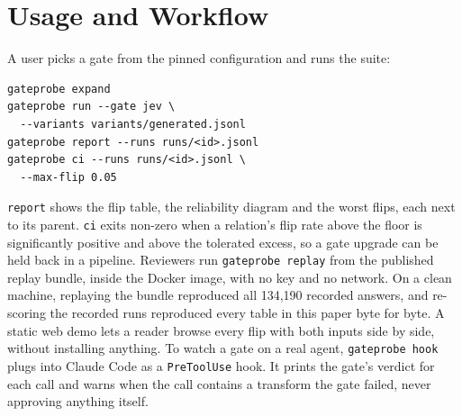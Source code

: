 
\section{Usage and Workflow}\label{sec:workflow}

A user picks a gate from the pinned configuration and runs the suite:
\begin{verbatim}
gateprobe expand
gateprobe run --gate jev \
  --variants variants/generated.jsonl
gateprobe report --runs runs/<id>.jsonl
gateprobe ci --runs runs/<id>.jsonl \
  --max-flip 0.05
\end{verbatim}
\texttt{report} shows the flip table, the reliability diagram and the worst
flips, each next to its parent. \texttt{ci} exits non-zero when a relation's
flip rate above the floor is significantly positive and above the tolerated
excess, so a gate upgrade can be held back in a pipeline. Reviewers run
\texttt{gateprobe replay} from the published replay bundle, inside the Docker
image, with no key and no network. On a clean machine, replaying the bundle
reproduced all 134,190 recorded answers, and re-scoring the recorded runs
reproduced every table in this paper byte for byte. A static web demo lets a
reader browse every flip with both inputs side by side, without installing
anything. To watch a gate on a real agent,
\texttt{gateprobe hook} plugs into Claude Code as a \texttt{PreToolUse} hook. It
prints the gate's verdict for each call and warns when the call contains a
transform the gate failed, never approving anything itself.
